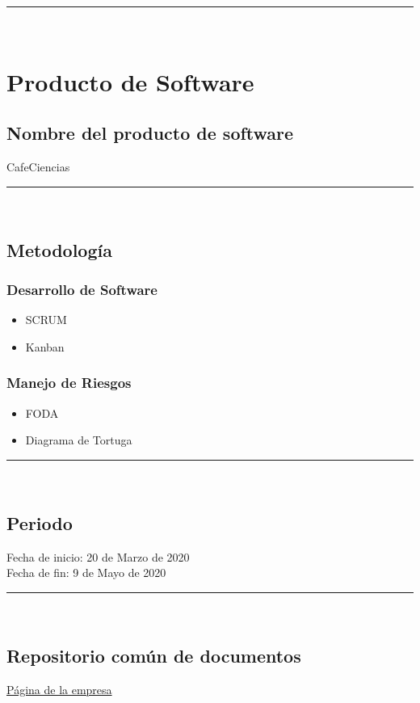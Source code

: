 \documentclass{article}
\begin{document}
\rule{0.8\textwidth}{.8pt}\\

\newpage
\section*{Producto de Software}

\subsection*{Nombre del producto de software}
CafeCiencias\\

\rule{0.8\textwidth}{.8pt}\\

\subsection*{Metodología}
\subsubsection*{Desarrollo de Software}
\begin{itemize}
\item SCRUM
\item Kanban
\end{itemize}
\subsubsection*{Manejo de Riesgos}
\begin{itemize}
\item FODA
\item Diagrama de Tortuga
\end{itemize}

\rule{0.8\textwidth}{.8pt}\\

\subsection*{Periodo}
Fecha de inicio: 20 de Marzo de 2020\\
\indent Fecha de fin: 9 de Mayo de 2020\\


\rule{0.8\textwidth}{.8pt}\\

\subsection*{Repositorio común de documentos}
\href{https://sites.google.com/view/vakas-lokas/p\%C3\%A1gina-principal?authuser=1}{Página de la empresa}
\end{document}
